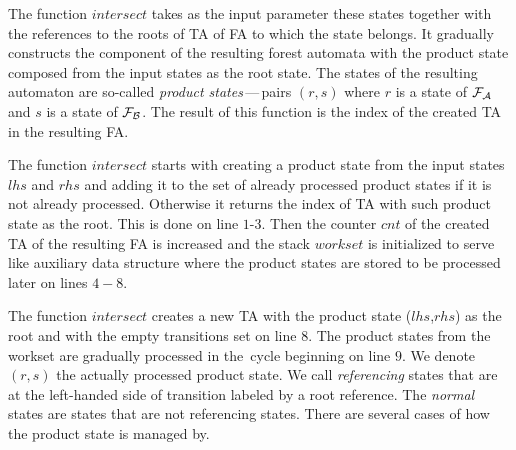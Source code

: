 The function $\mathit{intersect}$ takes as the input parameter these states together with
the references to the roots of TA of FA to which the state belongs.
It gradually constructs the component of the resulting forest automata
with the product state composed from the input states as the root state.
The states of the resulting automaton are so-called \emph{product states}\,---\,pairs $(r,s)$ where $r$ is a state of $\mathcal{F}_{\mathcal{A}}$
and $s$ is a state of $\mathcal{F}_{\mathcal{B}}$.
The result of this function is the index of the created TA in the resulting FA.

The function $\mathit{intersect}$ starts with creating a product state from the input states $lhs$ and $rhs$ and
adding it to the set of already processed product states if it is not already processed.
Otherwise it returns the index of TA with such product state as the root.
This is done on line $1$-$3$.
Then the counter $\mathit{cnt}$ of the created TA of the resulting FA is increased and
the stack $\mathit{workset}$ is initialized to serve like auxiliary data
structure where the product states are stored to be processed later on lines $4-8$.

The function $\mathit{intersect}$ creates a new TA with the product state ($lhs$,$rhs$) as the root
and with the empty transitions set on line $8$.
The product states from the workset are gradually processed in the~cycle beginning
on line $9$.
We denote $(r,s)$ the actually processed product state.
We call \emph{referencing} states that are at the left-handed side
of transition labeled by a root reference.
The \emph{normal} states are states that are not referencing states.
There are several cases of how the product state is managed by.



